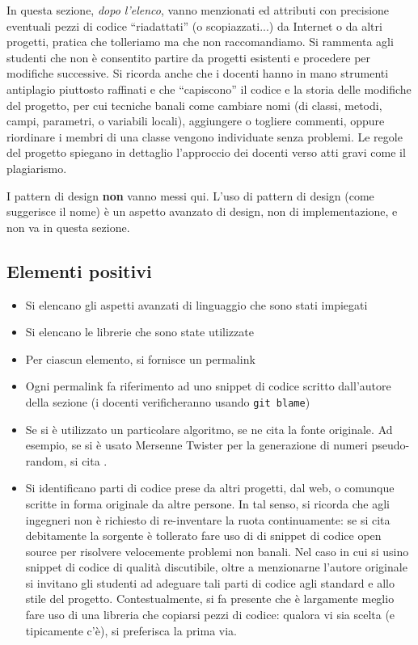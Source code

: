 \documentclass[a4paper,12pt]{report}
\begin{document}
\begin{itemize}
In questa sezione, \textit{dopo l'elenco},
vanno menzionati ed attributi con precisione eventuali pezzi di codice ``riadattati'' (o scopiazzati...) da Internet o da altri progetti,
pratica che tolleriamo ma che non raccomandiamo.
%
Si rammenta agli studenti che non è consentito partire da progetti esistenti e procedere per modifiche successive.
%
Si ricorda anche che i docenti hanno in mano strumenti antiplagio piuttosto raffinati e che ``capiscono'' il codice e la storia delle modifiche del progetto,
per cui tecniche banali come cambiare nomi (di classi, metodi, campi, parametri, o variabili locali),
aggiungere o togliere commenti,
oppure riordinare i membri di una classe vengono individuate senza problemi.
%
Le regole del progetto spiegano in dettaglio l'approccio dei docenti verso atti gravi come il plagiarismo.

I pattern di design \textbf{non} vanno messi qui.
%
L'uso di pattern di design (come suggerisce il nome) è un aspetto avanzato di design, non di implementazione,
e non va in questa sezione.

\subsection*{Elementi positivi}

\begin{itemize}
	\item Si elencano gli aspetti avanzati di linguaggio che sono stati impiegati
	\item Si elencano le librerie che sono state utilizzate
	\item Per ciascun elemento, si fornisce un permalink
	\item Ogni permalink fa riferimento ad uno snippet di codice scritto dall'autore della sezione (i docenti verificheranno usando \texttt{git blame})
	\item Se si è utilizzato un particolare algoritmo, se ne cita la fonte originale.
	Ad esempio, se si è usato Mersenne Twister per la generazione di numeri pseudo-random, si cita \cite{mersenne}.
	\item Si identificano parti di codice prese da altri progetti, dal web, o comunque scritte in forma originale da altre persone.
	In tal senso, si ricorda che agli ingegneri non è richiesto di re-inventare la ruota continuamente:
	se si cita debitamente la sorgente è tollerato fare uso di di snippet di codice open source per risolvere velocemente problemi non banali.
	Nel caso in cui si usino snippet di codice di qualità discutibile,
	oltre a menzionarne l'autore originale si invitano gli studenti ad adeguare tali parti di codice agli standard e allo stile del progetto.
	Contestualmente, si fa presente che è largamente meglio fare uso di una libreria che copiarsi pezzi di codice:
	qualora vi sia scelta (e tipicamente c'è), si preferisca la prima via.
\end{itemize}


\end{itemize}
\end{document}
